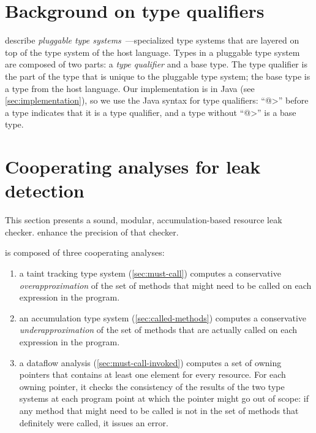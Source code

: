 \section{Background on type qualifiers}
\label{sec:background}

 describe
\emph{pluggable type systems}~\cite{FosterFFA99}---specialized type
systems that are layered on top of the type system of the host
language.  Types in a pluggable type system are composed of two parts:
a \emph{type qualifier} and a base type. The type qualifier is the
part of the type that is unique to the pluggable type system; the base
type is a type from the host language. Our implementation is in Java
(see \cref{sec:implementation}), so we use the Java syntax for type
qualifiers: ``\<@>'' before a type indicates that it is a type
qualifier, and a type without ``\<@>'' is a base type.


\section{Cooperating analyses for leak detection}
\label{sec:base-type-systems}

This section presents a sound, modular, accumulation-based
resource leak checker.
enhance the precision
of that checker.

\Tool is composed of three cooperating analyses:
\begin{enumerate}
\item a taint tracking type system (\cref{sec:must-call}) computes a conservative
  \emph{overapproximation} of the set of methods that might need to be called
  on each expression in the program.
\item an accumulation type system (\cref{sec:called-methods}) computes
  a conservative \emph{underapproximation} of the set of methods that are
  actually called on each expression in the program.
\item a dataflow analysis (\cref{sec:must-call-invoked}) computes a set
  of owning pointers that contains at least one element for every resource.
  For each owning pointer, it checks the consistency of the results
  of the two type systems at each program
  point at which the pointer might go out of scope:
  if any method that might need to be called is not in the set of methods
  that definitely were called, it issues an error.
\end{enumerate}

